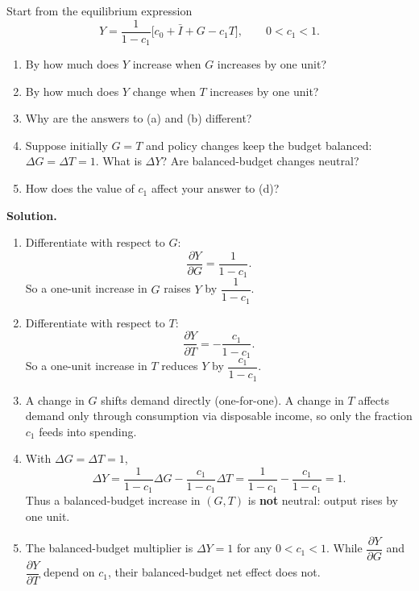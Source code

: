 \begin{examplebox}[title={Worked Example (Tutorial 1, Question 3): Balanced budget multiplier}]
Start from the equilibrium expression
\[
Y = \frac{1}{1-c_1}\bigl[c_0 + \bar I + G - c_1T\bigr],
\qquad 0<c_1<1.
\]
\begin{enumerate}[label=(\alph*)]
\item By how much does $Y$ increase when $G$ increases by one unit?
\item By how much does $Y$ change when $T$ increases by one unit?
\item Why are the answers to (a) and (b) different?
\item Suppose initially $G=T$ and policy changes keep the budget balanced: $\Delta G=\Delta T=1$.
What is $\Delta Y$? Are balanced-budget changes neutral?
\item How does the value of $c_1$ affect your answer to (d)?
\end{enumerate}

\textbf{Solution.}
\begin{enumerate}[label=(\alph*)]
\item Differentiate with respect to $G$:
\[
\frac{\partial Y}{\partial G} = \frac{1}{1-c_1}.
\]
So a one-unit increase in $G$ raises $Y$ by $\dfrac{1}{1-c_1}$.

\item Differentiate with respect to $T$:
\[
\frac{\partial Y}{\partial T} = -\frac{c_1}{1-c_1}.
\]
So a one-unit increase in $T$ reduces $Y$ by $\dfrac{c_1}{1-c_1}$.

\item A change in $G$ shifts demand directly (one-for-one).
A change in $T$ affects demand only through consumption via disposable income, so only the fraction $c_1$ feeds into spending.

\item With $\Delta G=\Delta T=1$,
\[
\Delta Y
= \frac{1}{1-c_1}\Delta G - \frac{c_1}{1-c_1}\Delta T
= \frac{1}{1-c_1} - \frac{c_1}{1-c_1}
= 1.
\]
Thus a balanced-budget increase in $(G,T)$ is \textbf{not} neutral: output rises by one unit.

\item The balanced-budget multiplier is
\(
\Delta Y = 1
\)
for any $0<c_1<1$.
While $\dfrac{\partial Y}{\partial G}$ and $\dfrac{\partial Y}{\partial T}$ depend on $c_1$, their balanced-budget net effect does not.
\end{enumerate}
\end{examplebox}



